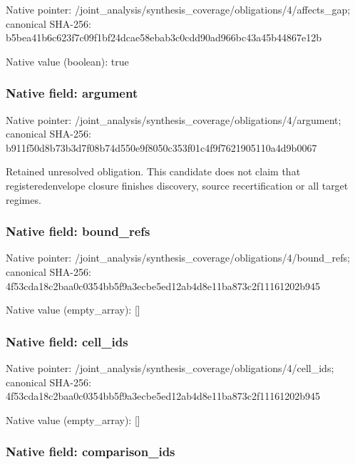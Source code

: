 \documentclass[10pt,a4paper]{article}
\begin{document}
Native pointer: /joint\_analysis/synthesi\allowbreak{}s\_coverage/obligations/4\allowbreak{}/affects\_gap; canonical SHA-256: b5bea41b6c623f7c09f1bf24\allowbreak{}dcae58ebab3c0cdd90ad966b\allowbreak{}c43a45b44867e12b



Native value (boolean): true



\subsubsection{Native field: argument}


Native pointer: /joint\_analysis/synthesi\allowbreak{}s\_coverage/obligations/4\allowbreak{}/argument; canonical SHA-256: b911f50d8b73b3d7f08b74d5\allowbreak{}50e9f8050c353f01c4f9f762\allowbreak{}1905110a4d9b0067


Retained unresolved obligation. This candidate does not claim that registeredenvelope closure finishes discovery, source recertification or all target regimes.


\subsubsection{Native field: bound\_refs}


Native pointer: /joint\_analysis/synthesi\allowbreak{}s\_coverage/obligations/4\allowbreak{}/bound\_refs; canonical SHA-256: 4f53cda18c2baa0c0354bb5f\allowbreak{}9a3ecbe5ed12ab4d8e11ba87\allowbreak{}3c2f11161202b945



Native value (empty\_array): []



\subsubsection{Native field: cell\_ids}


Native pointer: /joint\_analysis/synthesi\allowbreak{}s\_coverage/obligations/4\allowbreak{}/cell\_ids; canonical SHA-256: 4f53cda18c2baa0c0354bb5f\allowbreak{}9a3ecbe5ed12ab4d8e11ba87\allowbreak{}3c2f11161202b945



Native value (empty\_array): []



\subsubsection{Native field: comparison\_ids}
\end{document}
